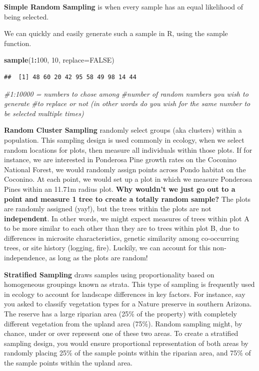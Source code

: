\documentclass[
]{book}
\newenvironment{Shaded}{\begin{snugshade}}{\end{snugshade}}
\newcommand{\AttributeTok}[1]{\textcolor[rgb]{0.13,0.29,0.53}{#1}}
\newcommand{\CommentTok}[1]{\textcolor[rgb]{0.56,0.35,0.01}{\textit{#1}}}
\newcommand{\ConstantTok}[1]{\textcolor[rgb]{0.56,0.35,0.01}{#1}}
\newcommand{\DecValTok}[1]{\textcolor[rgb]{0.00,0.00,0.81}{#1}}
\newcommand{\FunctionTok}[1]{\textcolor[rgb]{0.13,0.29,0.53}{\textbf{#1}}}
\newcommand{\NormalTok}[1]{#1}
\newcommand{\SpecialCharTok}[1]{\textcolor[rgb]{0.81,0.36,0.00}{\textbf{#1}}}
\begin{document}
\textbf{Simple Random Sampling} is when every sample has an equal likelihood of being selected.

We can quickly and easily generate such a sample in R, using the sample function.

\begin{Shaded}
\begin{Highlighting}[]
\FunctionTok{sample}\NormalTok{(}\DecValTok{1}\SpecialCharTok{:}\DecValTok{100}\NormalTok{, }\DecValTok{10}\NormalTok{, }\AttributeTok{replace=}\ConstantTok{FALSE}\NormalTok{)}
\end{Highlighting}
\end{Shaded}

\begin{verbatim}
##  [1] 48 60 20 42 95 58 49 98 14 44
\end{verbatim}

\begin{Shaded}
\begin{Highlighting}[]
\CommentTok{\#1:10000 = numbers to chose among }
\CommentTok{\#number of random numbers you wish to generate}
\CommentTok{\#to replace or not (in other words do you wish for the same number to be selected multiple times)}
\end{Highlighting}
\end{Shaded}

\textbf{Random Cluster Sampling} randomly select groups (aka clusters) within a population. This sampling design is used commonly in ecology, when we select random locations for plots, then measure all individuals within those plots. If for instance, we are interested in Ponderosa Pine growth rates on the Coconino National Forest, we would randomly assign points across Pondo habitat on the Coconino. At each point, we would set up a plot in which we measure Ponderosa Pines within an 11.71m radius plot. \textbf{Why wouldn't we just go out to a point and measure 1 tree to create a totally random sample?} The plots are randomly assigned (yay!), but the trees within the plots are not \textbf{independent}. In other words, we might expect measures of trees within plot A to be more similar to each other than they are to trees within plot B, due to differences in microsite characteristics, genetic similarity among co-occurring trees, or site history (logging, fire). Luckily, we can account for this non-independence, as long as the plots are random!

\textbf{Stratified Sampling} draws samples using proportionality based on homogeneous groupings known as strata. This type of sampling is frequently used in ecology to account for landscape differences in key factors. For instance, say you asked to classify vegetation types for a Nature preserve in southern Arizona. The reserve has a large riparian area (25\% of the property) with completely different vegetation from the upland area (75\%). Random sampling might, by chance, under or over represent one of these two areas. To create a stratified sampling design, you would ensure proportional representation of both areas by randomly placing 25\% of the sample points within the riparian area, and 75\% of the sample points within the upland area.
\end{document}
